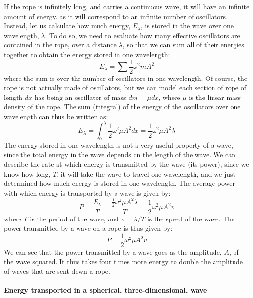 If the rope is infinitely long, and carries a continuous wave, it will have an infinite amount of energy, as it will correspond to an infinite number of oscillators. Instead, let us calculate how much energy, $E_\lambda$, is stored in the wave over one wavelength, $\lambda$. To do so, we need to evaluate how many effective oscillators are contained in the rope, over a distance $\lambda$, so that we can sum all of their energies together to obtain the energy stored in one wavelength:
\begin{equation}
E_\lambda = \sum \frac{1}{2}\omega^2 m A^2
\end{equation}
where the sum is over the number of oscillators in one wavelength. Of course, the rope is not actually made of oscillators, but we can model each section of rope of length $dx$ has being an oscillator of mass $dm=\mu dx$, where $\mu$ is the linear mass density of the rope. The sum (integral) of the energy of the oscillators over one wavelength can thus be written as:
\begin{equation}
E_\lambda = \int_0^\lambda \frac{1}{2}\omega^2 \mu A^2 dx =  \frac{1}{2}\omega^2 \mu A^2 \lambda
\end{equation}
The energy stored in one wavelength is not a very useful property of a wave, since the total energy in the wave depends on the length of the wave. We can describe the rate at which energy is transmitted by the wave (its power), since we know how long, $T$, it will take the wave to travel one wavelength, and we just determined how much energy is stored in one wavelength. The average power with which energy is transported by a wave is given by:
\begin{equation}
P = \frac{E_\lambda}{T} = \frac{\frac{1}{2}\omega^2 \mu A^2 \lambda}{T}=\frac{1}{2}\omega^2 \mu A^2 v
\end{equation}
where $T$ is the period of the wave, and $v=\lambda/T$ is the speed of the wave. The power transmitted by a wave on a rope is thus given by:
\begin{equation}
\boxed{P=\frac{1}{2}\omega^2 \mu A^2 v}
\end{equation}
We can see that the power transmitted by a wave goes as the amplitude, $A$, of the wave squared. It thus takes four times more energy to double the amplitude of waves that are sent down a rope.

\paragraph{Energy transported in a spherical, three-dimensional, wave}

